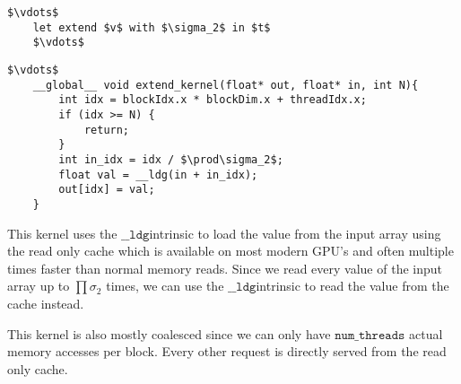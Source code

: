 \begin{lstlisting}[mathescape=true]
    $\vdots$
    let extend $v$ with $\sigma_2$ in $t$
    $\vdots$
\end{lstlisting}
\begin{lstlisting}[mathescape=true]
    $\vdots$
    __global__ void extend_kernel(float* out, float* in, int N){
        int idx = blockIdx.x * blockDim.x + threadIdx.x;
        if (idx >= N) {
            return;
        }
        int in_idx = idx / $\prod\sigma_2$;
        float val = __ldg(in + in_idx);
        out[idx] = val;
    }
\end{lstlisting}
\newcommand{\ldg}{\ensuremath{\texttt{\_\_ldg}}}
This kernel uses the \ldg intrinsic to load the value from the input
array using the read only cache which is available on most modern GPU's and often
multiple times faster than normal memory reads.
Since we read every value of the input array up to $\prod\sigma_2$ times, we
can use the \ldg intrinsic to read the value from the cache instead.

This kernel is also mostly coalesced since we can only have $\texttt{num\_threads}$ actual memory accesses per block.
Every other request is directly served from the read only cache.
\subsection{}

